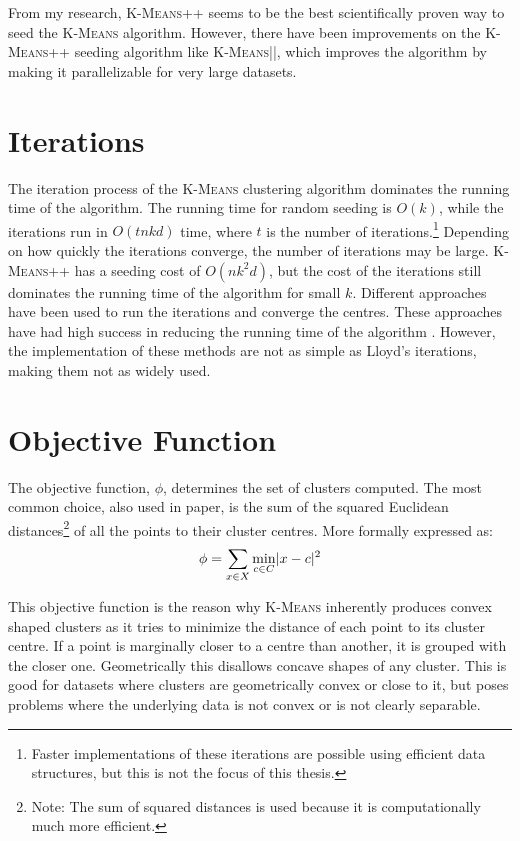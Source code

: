 \documentclass[12pt]{dalthesis}
\newcommand*{\kmeansn}{\textsc{K-Means}} %
\newcommand*{\kmeans}{\textsc{K-Means} } %
\DeclarePairedDelimiter\abs{\lvert}{\rvert}
\begin{document}
From my research, \kmeansn++ seems to be the best scientifically proven way to seed the \kmeans algorithm. However, there have been improvements on the \kmeansn++ seeding algorithm like \kmeansn||, which improves the algorithm by making it parallelizable for very large datasets. 


\section{Iterations}

The iteration process of the \kmeans clustering algorithm dominates the running time of the algorithm. The running time for random seeding is $O(k)$, while the iterations run in $O(tnkd)$ time, where $t$ is the number of iterations.\footnote{Faster implementations of these iterations are possible using efficient data structures, but this is not the focus of this thesis.} Depending on how quickly the iterations converge, the number of iterations may be large. \kmeansn++ has a seeding cost of $O(nk^2d)$, but the cost of the iterations still dominates the running time of the algorithm for small $k$.
Different approaches have been used to run the iterations and converge the centres. These approaches have had high success in reducing the running time of the algorithm \cite{alsabti1997efficient}. However, the implementation of these methods are not as simple as Lloyd's iterations, making them not as widely used. 


\section{Objective Function}
The objective function, $\phi$, determines the set of clusters computed. The most common choice, also used in paper, is the sum of the squared Euclidean distances\footnote{Note: The sum of squared distances is used because it is computationally much more efficient.}
of all the points to their cluster centres. More formally expressed as:
$$\phi = \sum_{x\in X} \min_{c\in C}\abs{ x-c}^2$$

This objective function is the reason why \kmeans inherently produces convex shaped clusters as it tries to minimize the distance of each point to its cluster centre. If a point is marginally closer to a centre than another, it is grouped with the closer one. Geometrically this disallows concave shapes of any cluster. This is good for datasets where clusters are geometrically convex or close to it, but poses problems where the underlying data is not convex or is not clearly separable.
\end{document}
